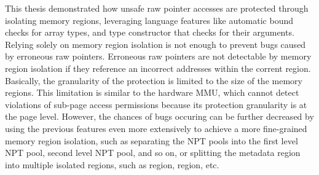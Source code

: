 This thesis demonstrated how unsafe raw pointer accesses are protected through
isolating memory regions,
leveraging language features like automatic bound checks for array types, and
type constructor that checks for their arguments.
Relying solely on memory region isolation is not enough to prevent bugs caused
by erroneous raw pointers.
Erroneous raw pointers are not detectable by memory region isolation if they
reference an incorrect addresses within the corrent region.
Basically, the granularity of the protection is limited to the size of the
memory regions. This limitation is similar to the hardware MMU, which cannot
detect violations of sub-page access permissions because its protection
granularity is at the page level.
However, the chances of bugs occuring can be further decreased by using the
previous features even more extensively to achieve a more fine-grained memory region
isolation, such as separating the NPT pools into the first level NPT pool,
second level NPT pool, and so on, or splitting the \rustcore{} metadata region
into multiple isolated regions, such as  region, 
region, etc.

%

